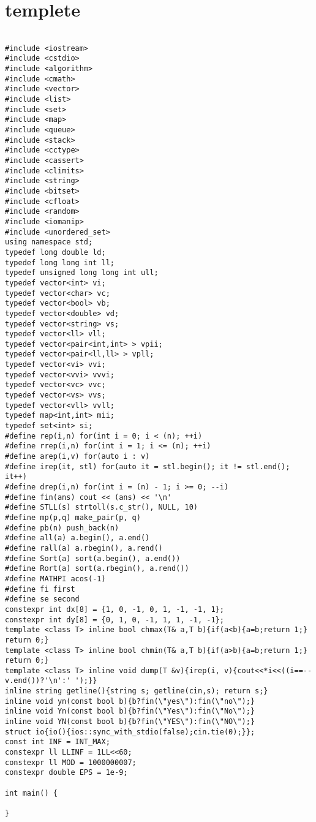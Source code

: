 \documentclass[a4j,titlepage]{jarticle} %
\begin{document}
\color{white}
\section{templete}
\color{black}
\begin{lstlisting}[caption=templete]

#include <iostream>
#include <cstdio>
#include <algorithm>
#include <cmath>
#include <vector>
#include <list>
#include <set>
#include <map>
#include <queue>
#include <stack>
#include <cctype>
#include <cassert>
#include <climits>
#include <string>
#include <bitset>
#include <cfloat>
#include <random>
#include <iomanip>
#include <unordered_set>
using namespace std;
typedef long double ld;
typedef long long int ll;
typedef unsigned long long int ull;
typedef vector<int> vi;
typedef vector<char> vc;
typedef vector<bool> vb;
typedef vector<double> vd;
typedef vector<string> vs;
typedef vector<ll> vll;
typedef vector<pair<int,int> > vpii;
typedef vector<pair<ll,ll> > vpll;
typedef vector<vi> vvi;
typedef vector<vvi> vvvi;
typedef vector<vc> vvc;
typedef vector<vs> vvs;
typedef vector<vll> vvll;
typedef map<int,int> mii;
typedef set<int> si;
#define rep(i,n) for(int i = 0; i < (n); ++i)
#define rrep(i,n) for(int i = 1; i <= (n); ++i)
#define arep(i,v) for(auto i : v)
#define irep(it, stl) for(auto it = stl.begin(); it != stl.end(); it++)
#define drep(i,n) for(int i = (n) - 1; i >= 0; --i)
#define fin(ans) cout << (ans) << '\n'
#define STLL(s) strtoll(s.c_str(), NULL, 10)
#define mp(p,q) make_pair(p, q)
#define pb(n) push_back(n)
#define all(a) a.begin(), a.end()
#define rall(a) a.rbegin(), a.rend()
#define Sort(a) sort(a.begin(), a.end())
#define Rort(a) sort(a.rbegin(), a.rend())
#define MATHPI acos(-1)
#define fi first
#define se second
constexpr int dx[8] = {1, 0, -1, 0, 1, -1, -1, 1};
constexpr int dy[8] = {0, 1, 0, -1, 1, 1, -1, -1};
template <class T> inline bool chmax(T& a,T b){if(a<b){a=b;return 1;} return 0;}
template <class T> inline bool chmin(T& a,T b){if(a>b){a=b;return 1;} return 0;}
template <class T> inline void dump(T &v){irep(i, v){cout<<*i<<((i==--v.end())?'\n':' ');}}
inline string getline(){string s; getline(cin,s); return s;}
inline void yn(const bool b){b?fin(\"yes\"):fin(\"no\");}
inline void Yn(const bool b){b?fin(\"Yes\"):fin(\"No\");}
inline void YN(const bool b){b?fin(\"YES\"):fin(\"NO\");}
struct io{io(){ios::sync_with_stdio(false);cin.tie(0);}};
const int INF = INT_MAX;
constexpr ll LLINF = 1LL<<60;
constexpr ll MOD = 1000000007;
constexpr double EPS = 1e-9;

int main() {
  
}

\end{lstlisting}
\end{document}
